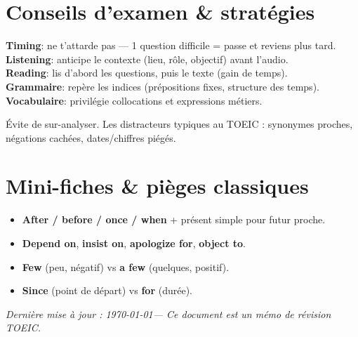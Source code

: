 \documentclass[11pt,a4paper]{article}
\newcommand{\Tip}[1]{\begin{TipBox}#1\end{TipBox}}
\newcommand{\Warn}[1]{\begin{WarnBox}#1\end{WarnBox}}
\begin{document}
\section{Conseils d’examen \& stratégies}
\Tip{
\textbf{Timing}: ne t’attarde pas — 1 question difficile = passe et reviens plus tard. \\
\textbf{Listening}: anticipe le contexte (lieu, rôle, objectif) avant l’audio. \\
\textbf{Reading}: lis d’abord les questions, puis le texte (gain de temps). \\
\textbf{Grammaire}: repère les indices (prépositions fixes, structure des temps). \\
\textbf{Vocabulaire}: privilégie collocations et expressions métiers.
}

\Warn{
Évite de sur-analyser. Les distracteurs typiques au TOEIC : synonymes proches, négations cachées, dates/chiffres piégés.
}

\section{Mini-fiches \& pièges classiques}
\begin{itemize}
  \item \textbf{After / before / once / when} + présent simple pour futur proche.
  \item \textbf{Depend on}, \textbf{insist on}, \textbf{apologize for}, \textbf{object to}.
  \item \textbf{Few} (peu, négatif) vs \textbf{a few} (quelques, positif).
  \item \textbf{Since} (point de départ) vs \textbf{for} (durée).
\end{itemize}



\vfill
\begin{center}
\small \textit{Dernière mise à jour : \today \;—\; Ce document est un mémo de révision TOEIC.}
\end{center}
\end{document}
